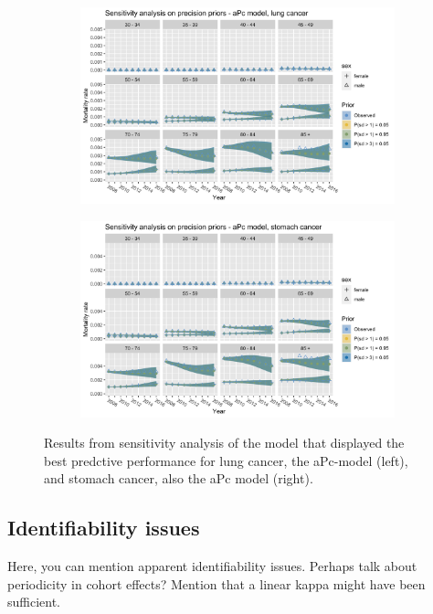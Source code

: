 \begin{figure}[h!]
    \centering
    \begin{subfigure}[b]{.45\linewidth}
        \includegraphics[width=\linewidth]{real-data/real-data-multivariate/Figures/sensitivity-analysis-aPc-by-period-lung.png}
    \end{subfigure}
    \begin{subfigure}[b]{.45\linewidth}
        \includegraphics[width=\linewidth]{real-data/real-data-multivariate/Figures/sensitivity-analysis-aPc-by-period-stomach.png}
    \end{subfigure}
    \caption{Results from sensitivity analysis of the model that displayed the best predctive performance for lung cancer, the aPc-model (left), and stomach cancer, also the aPc model (right). }
    \label{fig:mv-sensitivity}
\end{figure}

\newpage 
\subsection{Identifiability issues}
\textcolor{myDarkGreen}{
Here, you can mention apparent identifiability issues. Perhaps talk about periodicity in cohort effects? Mention that a linear kappa might have been sufficient. 
}

